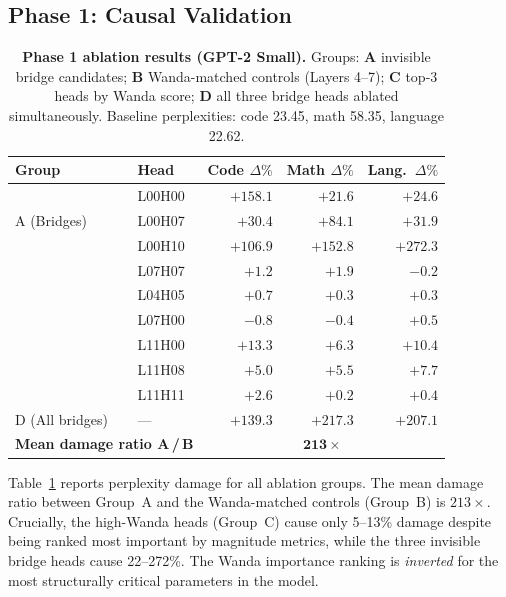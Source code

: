 \documentclass[11pt,a4paper]{article}
\theoremstyle{definition}
\theoremstyle{plain}
\begin{document}
\subsection{Phase 1: Causal Validation}
\label{sec:causal}

\begin{table}[t]
\centering
\caption{%
    \textbf{Phase 1 ablation results (GPT-2 Small).}
    Groups:
    \textbf{A} invisible bridge candidates;
    \textbf{B} Wanda-matched controls (Layers 4--7);
    \textbf{C} top-3 heads by Wanda score;
    \textbf{D} all three bridge heads ablated simultaneously.
    Baseline perplexities: code 23.45, math 58.35, language 22.62.
\label{tab:phase1}}
\small
\setlength{\tabcolsep}{5pt}
\begin{tabular}{llrrr}
\toprule
\textbf{Group} & \textbf{Head} &
\textbf{Code $\Delta\%$} & \textbf{Math $\Delta\%$} & \textbf{Lang.\ $\Delta\%$} \\
\midrule
\multirow{3}{*}{A (Bridges)}
  & L00H00 & $+158.1$ & $+21.6$  & $+24.6$ \\
  & L00H07 & $+30.4$  & $+84.1$  & $+31.9$ \\
  & L00H10 & $+106.9$ & $+152.8$ & $+272.3$ \\
\addlinespace
\multirow{3}{*}{B (Wanda ctrl.)}
  & L07H07 & $+1.2$  & $+1.9$  & $-0.2$ \\
  & L04H05 & $+0.7$  & $+0.3$  & $+0.3$ \\
  & L07H00 & $-0.8$  & $-0.4$  & $+0.5$ \\
\addlinespace
\multirow{3}{*}{C (High-Wanda)}
  & L11H00 & $+13.3$ & $+6.3$  & $+10.4$ \\
  & L11H08 & $+5.0$  & $+5.5$  & $+7.7$  \\
  & L11H11 & $+2.6$  & $+0.2$  & $+0.4$  \\
\addlinespace
D (All bridges) & ---
  & $+139.3$ & $+217.3$ & $+207.1$ \\
\midrule
\multicolumn{2}{l}{\textbf{Mean damage ratio A\,/\,B}}
  & \multicolumn{3}{c}{$\mathbf{213\times}$} \\
\bottomrule
\end{tabular}
\end{table}

Table~\ref{tab:phase1} reports perplexity damage for all ablation groups.
The mean damage ratio between Group~A and the Wanda-matched controls
(Group~B) is $213\times$.
Crucially, the high-Wanda heads (Group~C) cause only 5--13\% damage
despite being ranked most important by magnitude metrics, while the three
invisible bridge heads cause 22--272\%.
The Wanda importance ranking is \emph{inverted} for the most structurally
critical parameters in the model.
\end{document}
